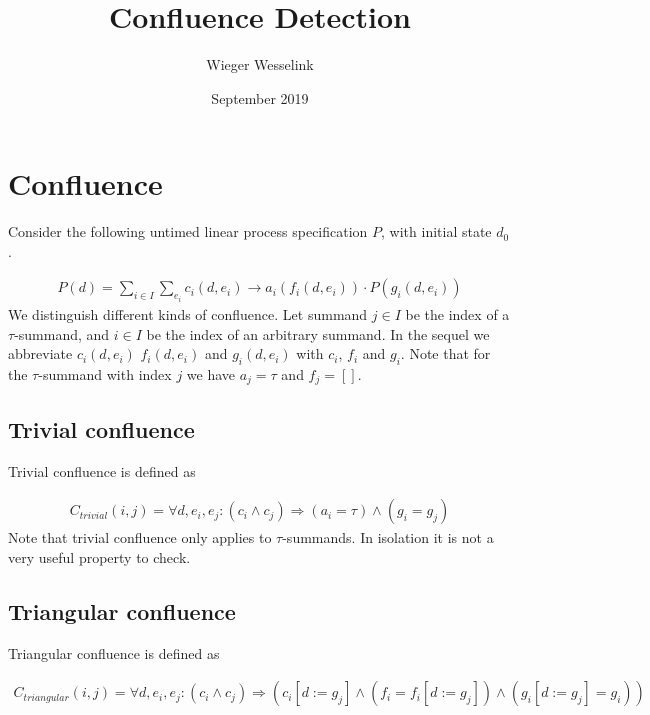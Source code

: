 \documentclass{article}
\title{Confluence Detection}
\author{Wieger Wesselink}
\date{September 2019}
\begin{document}
\maketitle

\section{Confluence}
Consider the following untimed linear process specification $P$, with initial state $d_0$.

\[
\begin{array}{l}
P(d)=
\sum\limits_{i\in I}\sum\limits_{e_i}c_i(d, e_i)\rightarrow a_i(f_i(d,e_i)) \cdot P(g_i(d,e_i))
\end{array}
\]
We distinguish different kinds of confluence. Let summand $j \in I$ be the index of a $\tau$-summand, and $i \in I$ be the index of an arbitrary summand.
In the sequel we abbreviate $c_i(d,e_i)$ $f_i(d,e_i)$ and $g_i(d,e_i)$ with $c_i$, $f_i$ and $g_i$. Note that for the $\tau$-summand with index $j$ we have $a_j = \tau$ and $f_j = []$.

\subsection{Trivial confluence}

Trivial confluence is defined as

\begin{equation*}
\begin{array}{l}
C_{trivial}(i, j) = \forall d, e_i, e_j : (c_i \land c_j) \Rightarrow  
      (a_i = \tau) 
     \land (g_i = g_j)
\end{array}
\end{equation*}
Note that trivial confluence only applies to $\tau$-summands. In isolation it is not a very useful property to check.

\subsection{Triangular confluence}

Triangular confluence is defined as

\begin{equation*}
\begin{array}{l}
C_{triangular}(i, j) = \forall d, e_i, e_j : (c_i \land c_j) \Rightarrow
      (c_i[d := g_j]
\land (f_i = f_i[d := g_j])
\land (g_i[d := g_j] = g_i))
\end{array}
\end{equation*}
\end{document}
